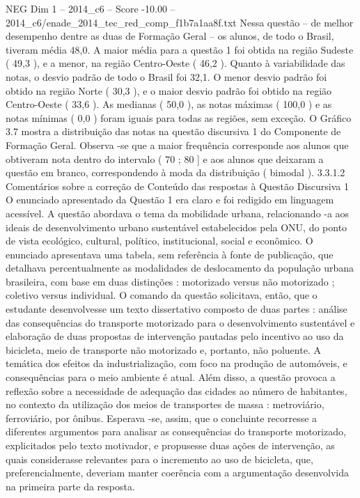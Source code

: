 \begin{textsample}{NEG Dim 1 – 2014\_c6 – Score -10.00 – 2014\_c6/enade\_2014\_tec\_red\_comp\_f1b7a1aa8f.txt}
Nessa questão – de melhor desempenho dentre as duas de Formação Geral – os alunos, de todo o Brasil, tiveram média 48,0.
A maior média para a questão 1 foi obtida na região Sudeste ( 49,3 ), e a menor, na região Centro-Oeste ( 46,2 ).
Quanto à variabilidade das notas, o desvio padrão de todo o Brasil foi 32,1.
O menor desvio padrão foi obtido na região Norte ( 30,3 ), e o maior desvio padrão foi obtido na região Centro-Oeste ( 33,6 ).
As medianas ( 50,0 ), as notas máximas ( 100,0 ) e as notas mínimas ( 0,0 ) foram iguais para todas as regiões, sem exceção.
O Gráfico 3.7 mostra a distribuição das notas na questão discursiva 1 do Componente de Formação Geral.
Observa -se que a maior frequência corresponde aos alunos que obtiveram nota dentro do intervalo ( 70 ; 80 ] e aos alunos que deixaram a questão em branco, correspondendo à moda da distribuição ( bimodal ). 3.3.1.2 Comentários sobre a correção de Conteúdo das respostas à Questão Discursiva 1 O enunciado apresentado da Questão 1 era claro e foi redigido em linguagem acessível.
A questão abordava o tema da mobilidade urbana, relacionando -a aos ideais de desenvolvimento urbano sustentável estabelecidos pela ONU, do ponto de vista ecológico, cultural, político, institucional, social e econômico.
O enunciado apresentava uma tabela, sem referência à fonte de publicação, que detalhava percentualmente as modalidades de deslocamento da população urbana brasileira, com base em duas distinções : motorizado versus não motorizado ; coletivo versus individual.
O comando da questão solicitava, então, que o estudante desenvolvesse um texto dissertativo composto de duas partes : análise das consequências do transporte motorizado para o desenvolvimento sustentável e elaboração de duas propostas de intervenção pautadas pelo incentivo ao uso da bicicleta, meio de transporte não motorizado e, portanto, não poluente.
A temática dos efeitos da industrialização, com foco na produção de automóveis, e consequências para o meio ambiente é atual.
Além disso, a questão provoca a reflexão sobre a necessidade de adequação das cidades ao número de habitantes, no contexto da utilização dos meios de transportes de massa : metroviário, ferroviário, por ônibus.
Esperava -se, assim, que o concluinte recorresse a diferentes argumentos para analisar as consequências do transporte motorizado, explicitados pelo texto motivador, e propusesse duas ações de intervenção, as quais considerasse relevantes para o incremento ao uso de bicicleta, que, preferencialmente, deveriam manter coerência com a argumentação desenvolvida na primeira parte da resposta.

\end{textsample}
